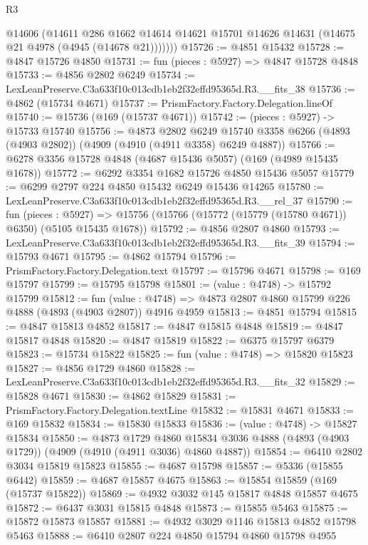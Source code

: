 \begin{lexlean}{R3}
\begin{coremodule}
          @14606
          (@14611
            @286
            @1662
            @14614
            @14621
            @15701
            @14626
            @14631
            (@14675 @21 @4978 (@4945 (@14678 @21)))))))
@15726 := @4851 @15432
@15728 := @4847 @15726 @4850
@15731 := fun (pieces : @5927) => @4847 @15728 @4848
@15733 := @4856 @2802 @6249
@15734 := LexLeanPreserve.C3a633f10c013cdb1eb2f32effd95365d.R3.__fits_38
@15736 := @4862 (@15734 @4671)
@15737 := PrismFactory.Factory.Delegation.lineOf
@15740 := @15736 (@169 (@15737 @4671))
@15742 := (pieces : @5927) -> @15733 @15740
@15756 := @4873
    @2802
    @6249
    @15740
    @3358
    @6266
    (@4893 (@4903 @2802))
    (@4909 (@4910 (@4911 @3358) @6249 @4887))
@15766 := @6278 @3356 @15728 @4848 (@4687 @15436 @5057) (@169 (@4989 @15435 @1678))
@15772 := @6292 @3354 @1682 @15726 @4850 @15436 @5057
@15779 := @6299 @2797 @224 @4850 @15432 @6249 @15436 @14265
@15780 := LexLeanPreserve.C3a633f10c013cdb1eb2f32effd95365d.R3.__rel_37
@15790 := fun (pieces : @5927) =>
  @15756 (@15766 (@15772 (@15779 (@15780 @4671)) @6350) (@5105 @15435 @1678))
@15792 := @4856 @2807 @4860
@15793 := LexLeanPreserve.C3a633f10c013cdb1eb2f32effd95365d.R3.__fits_39
@15794 := @15793 @4671
@15795 := @4862 @15794
@15796 := PrismFactory.Factory.Delegation.text
@15797 := @15796 @4671
@15798 := @169 @15797
@15799 := @15795 @15798
@15801 := (value : @4748) -> @15792 @15799
@15812 := fun (value : @4748) =>
  @4873 @2807 @4860 @15799 @226 @4888 (@4893 (@4903 @2807)) @4916 @4959
@15813 := @4851 @15794
@15815 := @4847 @15813 @4852
@15817 := @4847 @15815 @4848
@15819 := @4847 @15817 @4848
@15820 := @4847 @15819
@15822 := @6375 @15797 @6379
@15823 := @15734 @15822
@15825 := fun (value : @4748) => @15820 @15823
@15827 := @4856 @1729 @4860
@15828 := LexLeanPreserve.C3a633f10c013cdb1eb2f32effd95365d.R3.__fits_32
@15829 := @15828 @4671
@15830 := @4862 @15829
@15831 := PrismFactory.Factory.Delegation.textLine
@15832 := @15831 @4671
@15833 := @169 @15832
@15834 := @15830 @15833
@15836 := (value : @4748) -> @15827 @15834
@15850 := @4873
    @1729
    @4860
    @15834
    @3036
    @4888
    (@4893 (@4903 @1729))
    (@4909 (@4910 (@4911 @3036) @4860 @4887))
@15854 := @6410 @2802 @3034 @15819 @15823
@15855 := @4687 @15798
@15857 := @5336 (@15855 @6442)
@15859 := @4687 @15857 @4675
@15863 := @15854 @15859 (@169 (@15737 @15822))
@15869 := @4932 @3032 @145 @15817 @4848 @15857 @4675
@15872 := @6437 @3031 @15815 @4848
@15873 := @15855 @5463
@15875 := @15872 @15873 @15857
@15881 := @4932 @3029 @1146 @15813 @4852 @15798 @5463
@15888 := @6410 @2807 @224 @4850 @15794 @4860 @15798 @4955

\end{coremodule}
\end{lexlean}
